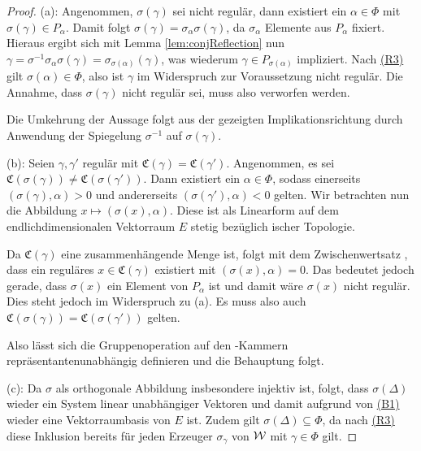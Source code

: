 \begin{proof}
  (a): 
  Angenommen, $\sigma(\gamma)$ sei nicht regulär, dann existiert ein $\alpha \in \Phi$ mit $\sigma(\gamma) \in P_\alpha$.
  Damit folgt $\sigma(\gamma) = \sigma_\alpha \sigma(\gamma)$, da $\sigma_\alpha$ Elemente aus $P_\alpha$ fixiert.
  Hieraus ergibt sich mit Lemma \ref{lem:conjReflection} nun $\gamma = \sigma^{-1} \sigma_\alpha \sigma(\gamma) = \sigma_{\sigma(\alpha)}(\gamma)$, was wiederum $\gamma \in P_{\sigma(\alpha)}$ impliziert.
  Nach \hyperref[it:R3]{(R3)} gilt $\sigma(\alpha) \in \Phi$, also ist $\gamma$ im Widerspruch zur Voraussetzung nicht regulär.
  Die Annahme, dass $\sigma(\gamma)$ nicht regulär sei, muss also verworfen werden.
  
  Die Umkehrung der Aussage folgt aus der gezeigten Implikationsrichtung durch Anwendung der Spiegelung $\sigma^{-1}$ auf $\sigma(\gamma)$.

  (b): 
  Seien $\gamma, \gamma'$ regulär mit $\mathfrak{C}(\gamma) = \mathfrak{C}(\gamma')$.
  Angenommen, es sei $\mathfrak{C}(\sigma(\gamma)) \neq \mathfrak{C}(\sigma(\gamma'))$.
  Dann existiert ein $\alpha \in \Phi$, sodass einerseits $(\sigma(\gamma), \alpha) > 0$ und andererseits $(\sigma(\gamma'), \alpha) < 0$ gelten.
  Wir betrachten nun die Abbildung $x \mapsto  (\sigma(x), \alpha)$.
  Diese ist als Linearform auf dem endlichdimensionalen Vektorraum $E$ stetig bezüglich \euklid ischer Topologie.

  Da $\mathfrak{C}(\gamma)$ eine zusammenhängende Menge ist, folgt mit dem Zwischenwertsatz 
  , dass ein reguläres $x \in \mathfrak{C}(\gamma)$ existiert mit $(\sigma(x), \alpha) = 0$.
  Das bedeutet jedoch gerade, dass $\sigma(x)$ ein Element von $P_\alpha$ ist und damit wäre $\sigma(x)$ nicht regulär.
  Dies steht jedoch im Widerspruch zu (a). 
  Es muss also auch $\mathfrak{C}(\sigma(\gamma)) = \mathfrak{C}(\sigma(\gamma'))$ gelten.

  Also lässt sich die Gruppenoperation auf den \weyl\hyp{}Kammern repräsentantenunabhängig definieren und die Behauptung folgt.
  
  (c): 
  Da $\sigma$ als orthogonale Abbildung insbesondere injektiv ist, folgt, dass $\sigma(\Delta)$ wieder ein System linear unabhängiger Vektoren und damit aufgrund von \hyperref[it:B1]{(B1)} wieder eine Vektorraumbasis von $E$ ist.
  Zudem gilt $\sigma(\Delta) \subseteq \Phi$, da nach \hyperref[it:R3]{(R3)} diese Inklusion bereits für jeden Erzeuger $\sigma_\gamma$ von $\mathcal{W}$ mit $\gamma \in \Phi$ gilt.
  

\end{proof}
